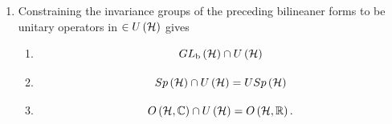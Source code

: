 \begin{enumerate}
\begin{enumerate}
\item Non degenerate symmetric bilinear products on ${\cal H}$ can be
denoted by 
\begin{equation}
\left( \left. v_{1}\right\vert v_{2}\right) _{s}={\rm s}\left(
v_{1},v_{2}\right) ,
\end{equation}%
which can be null, indefinite or complex valued i.e. $\left( \left.
v\right\vert v\right) _{s}$ can have the values 
\begin{equation}
\left( \left. v\right\vert v\right) _{s}=\left\{ 
\begin{array}{c}
0 \\ 
x<0 \\ 
z\in {\Bbb C}%
\end{array}%
\right. .
\end{equation}

\item The invariance group of ${\rm s}$ is the complex orthogonal group $%
O\left( {\cal H},{\Bbb C}\right) $ and defined as 
\begin{equation}
\left\{ \left. T\in GL\left( {\cal H}\right) \right\vert {\rm s}\left\{
Tv_{1},Tv_{2}\right\} =\left( Tv_{1},Tv_{2}\right) _{e}={\rm s}\left(
v_{1},v_{2}\right) =\left( v_{1},v_{2}\right) _{e}\forall v_{1},v_{2}\in 
{\cal H}\right\} .
\end{equation}
\end{enumerate}

\item Constraining the invariance groups of the preceding bilineaner forms
to be unitary operators in $\in U\left( {\cal H}\right) $ gives

\begin{enumerate}
\item 
\begin{equation}
GL_{{\rm b}}\left( {\cal H}\right) \cap U\left( {\cal H}\right)
\end{equation}

\item 
\begin{equation}
Sp\left( {\cal H}\right) \cap U\left( {\cal H}\right) =USp\left( {\cal H}%
\right)
\end{equation}

\item 
\begin{equation}
O\left( {\cal H},{\Bbb C}\right) \cap U\left( {\cal H}\right) =O\left( {\cal %
H},{\Bbb R}\right) .
\end{equation}
\end{enumerate}


\end{enumerate}

